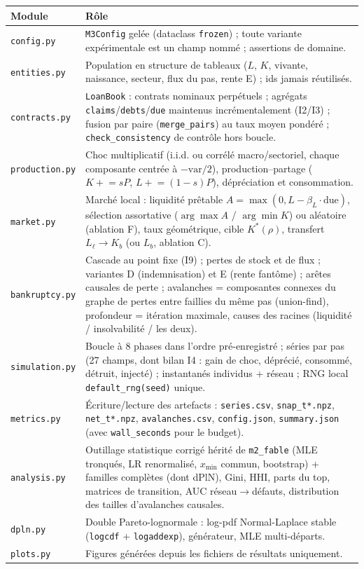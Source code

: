 \documentclass[11pt,a4paper]{article}
\newcommand{\code}[1]{\texttt{#1}}
\begin{document}
\begin{center}
\small
\begin{tabular}{lp{9.6cm}}
\toprule
Module & Rôle \\
\midrule
\code{config.py} & \code{M3Config} gelée (dataclass \code{frozen}) ; toute
variante expérimentale est un champ nommé ; assertions de domaine. \\
\code{entities.py} & Population en structure de tableaux ($L$, $K$, vivante,
naissance, secteur, flux du pas, rente E) ; ids jamais réutilisés. \\
\code{contracts.py} & \code{LoanBook} : contrats nominaux perpétuels ;
agrégats \code{claims}/\code{debts}/\code{due} maintenus incrémentalement
(I2/I3) ; fusion par paire (\code{merge\_pairs}) au taux moyen pondéré ;
\code{check\_consistency} de contrôle hors boucle. \\
\code{production.py} & Choc multiplicatif (i.i.d. ou corrélé macro/sectoriel,
chaque composante centrée à $-\mathrm{var}/2$), production--partage
($K \mathrel{+}= sP$, $L \mathrel{+}= (1{-}s)P$), dépréciation et
consommation. \\
\code{market.py} & Marché local : liquidité prêtable
$A = \max(0, L - \beta_L \cdot \mathrm{due})$, sélection assortative
($\arg\max A$ / $\arg\min K$) ou aléatoire (ablation F), taux géométrique,
cible $K^*(\rho)$, transfert $L_\ell \to K_b$ (ou $L_b$, ablation C). \\
\code{bankruptcy.py} & Cascade au point fixe (I9) ; pertes de stock et de
flux ; variantes D (indemnisation) et E (rente fantôme) ; arêtes causales de
perte ; avalanches = composantes connexes du graphe de pertes entre faillies
du même pas (union-find), profondeur = itération maximale, causes des
racines (liquidité / insolvabilité / les deux). \\
\code{simulation.py} & Boucle à 8 phases dans l'ordre pré-enregistré ;
séries par pas (27 champs, dont bilan I4 : gain de choc, déprécié, consommé,
détruit, injecté) ; instantanés individus + réseau ; RNG local
\code{default\_rng(seed)} unique. \\
\code{metrics.py} & Écriture/lecture des artefacts : \code{series.csv},
\code{snap\_t*.npz}, \code{net\_t*.npz}, \code{avalanches.csv},
\code{config.json}, \code{summary.json} (avec \code{wall\_seconds} pour le
budget). \\
\code{analysis.py} & Outillage statistique corrigé hérité de
\code{m2\_fable} (MLE tronqués, LR renormalisé, $x_{\min}$ commun,
bootstrap) + familles complètes (dont dPlN), Gini, HHI, parts du top,
matrices de transition, AUC réseau$\to$défauts, distribution des tailles
d'avalanches causales. \\
\code{dpln.py} & Double Pareto-lognormale : log-pdf Normal-Laplace stable
(\code{logcdf} + \code{logaddexp}), générateur, MLE multi-départs. \\
\code{plots.py} & Figures générées depuis les fichiers de résultats
uniquement. \\
\bottomrule
\end{tabular}
\end{center}
\end{document}
